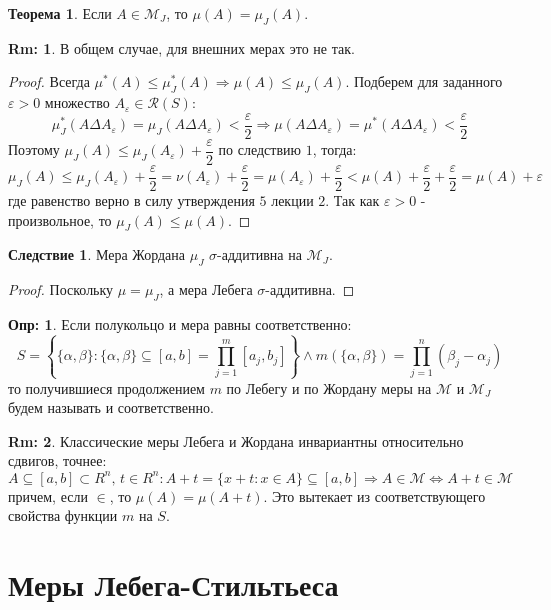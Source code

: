 \documentclass[12pt]{article}
\newcommand{\MCR}{\mathcal{R}}
\newcommand{\MM}{\mathcal{M}}
\newcommand{\VE}{\varepsilon}
\theoremstyle{definition}
\newtheorem{defn}{Опр:}
\newtheorem{rem}{Rm:}
\newtheorem{theorem}{Теорема}
\newtheorem{corollary}{Следствие}
\begin{document}
\begin{theorem}
	Если $A \in \MM_J$, то $\mu(A) = \mu_J(A)$.
\end{theorem}
\begin{rem}
	В общем случае, для внешних мерах это не так.
\end{rem}
\begin{proof}
	Всегда $\mu^*(A) \leq \mu_J^*(A) \Rightarrow \mu(A) \leq \mu_J(A)$. Подберем для заданного $\VE > 0$ множество $A_\VE \in \MCR(S)$:
	$$
		\mu_J^*(A \Delta A_\VE) = \mu_J(A \Delta A_\VE) < \dfrac{\VE}{2} \Rightarrow \mu(A \Delta A_\VE) = \mu^*(A \Delta A_\VE) < \dfrac{\VE}{2}
	$$
	Поэтому $\mu_J(A) \leq \mu_J(A_\VE) + \dfrac{\VE}{2}$ по следствию $1$, тогда:
	$$
		\mu_J(A) \leq \mu_J(A_\VE) + \dfrac{\VE}{2} = \nu(A_\VE) + \dfrac{\VE}{2} = \mu(A_\VE) + \dfrac{\VE}{2} < \mu(A) + \dfrac{\VE}{2} + \dfrac{\VE}{2} = \mu(A) + \VE
	$$
	где равенство верно в силу утверждения $5$ лекции $2$. Так как $\VE > 0$ - произвольное, то $\mu_J(A) \leq \mu(A)$.
\end{proof}
\begin{corollary}
	Мера Жордана $\mu_J$ $\sigma$-аддитивна на $\MM_J$.
\end{corollary}
\begin{proof}
	Поскольку $\mu = \mu_J$, а мера Лебега $\sigma$-аддитивна.
\end{proof}
\begin{defn}
	Если полукольцо и мера равны соответственно:
	$$
		S = \left\{ \{\alpha,\beta\} \colon \{\alpha, \beta\} \subseteq [a,b] = \prod\limits_{j = 1}^m [a_j, b_j]  \right\} \wedge m(\{\alpha,\beta\}) = \prod\limits_{j = 1}^n(\beta_j - \alpha_j)
	$$
	то получившиеся продолжением $m$ по Лебегу и по Жордану меры на $\MM$ и $\MM_J$ будем называть  и  соответственно.
\end{defn} 
\begin{rem}
	Классические меры Лебега и Жордана инвариантны относительно сдвигов, точнее:
	$$
		A \subseteq [a,b] \subset R^n, \, t \in R^n \colon A + t = \{x +t \colon x\in A\}\subseteq[a,b] \Rightarrow A\in \MM \Leftrightarrow A + t \in \MM
	$$
	причем, если $\in$, то $\mu(A) = \mu(A+t)$. Это вытекает из соответствующего свойства функции $m$ на $S$.
\end{rem}
\newpage
\section*{Меры Лебега-Стильтьеса}
\end{document}

